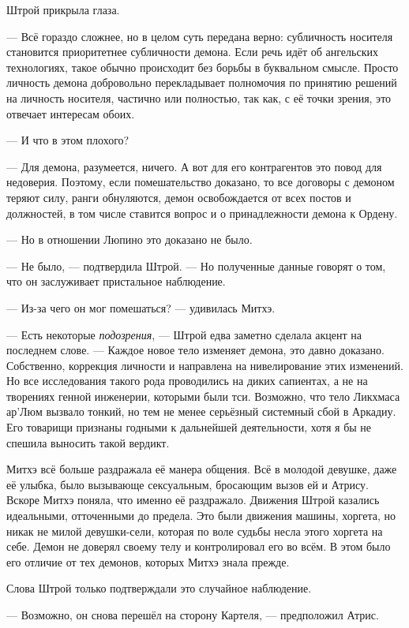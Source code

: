 Штрой прикрыла глаза.

--- Всё гораздо сложнее, но в целом суть передана верно: субличность носителя становится приоритетнее субличности демона.
Если речь идёт об ангельских технологиях, такое обычно происходит без борьбы в буквальном смысле.
Просто личность демона добровольно перекладывает полномочия по принятию решений на личность носителя, частично или полностью, так как, с её точки зрения, это отвечает интересам обоих.

--- И что в этом плохого?

--- Для демона, разумеется, ничего.
А вот для его контрагентов это повод для недоверия.
Поэтому, если помешательство доказано, то все договоры с демоном теряют силу, ранги обнуляются, демон освобождается от всех постов и должностей, в том числе ставится вопрос и о принадлежности демона к Ордену.

--- Но в отношении Люпино это доказано не было.

--- Не было, --- подтвердила Штрой.
--- Но полученные данные говорят о том, что он заслуживает пристальное наблюдение.

--- Из-за чего он мог помешаться? --- удивилась Митхэ.

--- Есть некоторые \emph{подозрения}, --- Штрой едва заметно сделала акцент на последнем слове.
--- Каждое новое тело изменяет демона, это давно доказано.
Собственно, коррекция личности и направлена на нивелирование этих изменений.
Но все исследования такого рода проводились на диких сапиентах, а не на творениях генной инженерии, которыми были тси.
Возможно, что тело Ликхмаса ар’Люм вызвало тонкий, но тем не менее серьёзный системный сбой в Аркадиу.
Его товарищи признаны годными к дальнейшей деятельности, хотя я бы не спешила выносить такой вердикт.

Митхэ всё больше раздражала её манера общения.
Всё в молодой девушке, даже её улыбка, было вызывающе сексуальным, бросающим вызов ей и Атрису.
Вскоре Митхэ поняла, что именно её раздражало.
Движения Штрой казались идеальными, отточенными до предела.
Это были движения машины, хоргета, но никак не милой девушки-сели, которая по воле судьбы несла этого хоргета на себе.
Демон не доверял своему телу и контролировал его во всём.
В этом было его отличие от тех демонов, которых Митхэ знала прежде.

Слова Штрой только подтверждали это случайное наблюдение.

--- Возможно, он снова перешёл на сторону Картеля, --- предположил Атрис.

